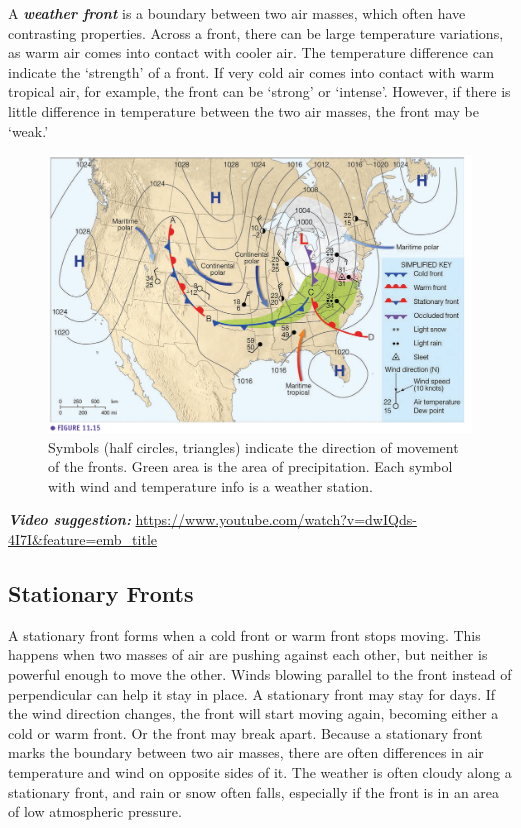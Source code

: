 \documentclass[12pt,oneside]{book}
\begin{document}
A \textbf{\emph{weather front}} is a boundary between two air masses,
which often have contrasting properties. Across a front, there can be
large temperature variations, as warm air comes into contact with cooler
air. The temperature difference can indicate the `strength' of a front.
If very cold air comes into contact with warm tropical air, for example,
the front can be `strong' or `intense'. However, if there is little
difference in temperature between the two air masses, the front may be
`weak.'

\begin{figure}

{\centering \includegraphics[width=0.8\linewidth]{figures/Figure621} 

}

\caption{Symbols (half circles, triangles) indicate  the direction of movement of the fronts. Green area is the area of precipitation. Each symbol with wind and temperature info is a weather station. }\label{fig:Fig621}
\end{figure}

\textbf{\emph{Video suggestion:}}
\url{https://www.youtube.com/watch?v=dwIQds-4I7I\&feature=emb_title}

\subsection{Stationary Fronts}\label{stationary-fronts}

A stationary front forms when a cold front or warm front stops moving.
This happens when two masses of air are pushing against each other, but
neither is powerful enough to move the other. Winds blowing parallel to
the front instead of perpendicular can help it stay in place. A
stationary front may stay for days. If the wind direction changes, the
front will start moving again, becoming either a cold or warm front. Or
the front may break apart. Because a stationary front marks the boundary
between two air masses, there are often differences in air temperature
and wind on opposite sides of it. The weather is often cloudy along a
stationary front, and rain or snow often falls, especially if the front
is in an area of low atmospheric pressure.
\end{document}
